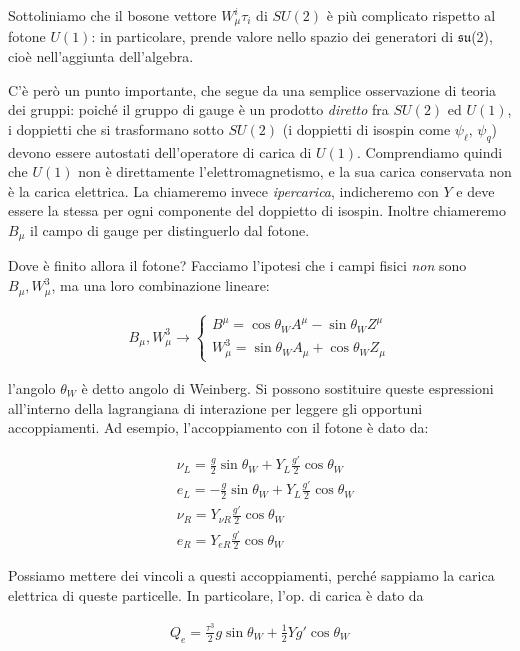 \documentclass[11pt]{report}
\begin{document}
Sottoliniamo che il bosone vettore \(W^i_\mu\tau_i\) di \(SU(2)\) è più complicato rispetto al fotone \(U(1)\): in particolare, prende valore nello spazio dei generatori di \(\mathfrak{su}\)(2), cioè nell'aggiunta dell'algebra. 

C'è però un punto importante, che segue da una semplice osservazione di teoria dei gruppi: poiché il gruppo di gauge è un prodotto \emph{diretto} fra \(SU(2)\) ed \(U(1)\), i doppietti che si trasformano sotto \(SU(2)\) (i doppietti di isospin come \(\psi_\ell, \, \psi_q\)) devono essere autostati dell'operatore di carica di \(U(1)\). Comprendiamo quindi che \(U(1)\) non è direttamente l'elettromagnetismo, e la sua carica conservata non è la carica elettrica. La chiameremo invece \emph{ipercarica}, indicheremo con \(Y\) e deve essere la stessa per ogni componente del doppietto di isospin. Inoltre chiameremo \(B_\mu\) il campo di gauge per distinguerlo dal fotone. 

Dove è finito allora il fotone? Facciamo l'ipotesi che i campi fisici \emph{non} sono \(B_\mu, W_\mu^3\), ma una loro combinazione lineare: 

\begin{align}
    B_\mu, W_\mu^3 \rightarrow \begin{cases}
        B^\mu = \cos\theta_W A^\mu - \sin\theta_W Z^\mu \\
        W^3_\mu = \sin\theta_W A_\mu + \cos\theta_W Z_\mu
    \end{cases}
\end{align}

l'angolo \(\theta_W\) è detto angolo di Weinberg. Si possono sostituire queste espressioni all'interno della lagrangiana di interazione per leggere gli opportuni accoppiamenti. Ad esempio, l'accoppiamento con il fotone è dato da: 

\begin{align}
    &\nu_L = \frac{g}{2}\sin\theta_W + Y_L \frac{g'}{2}\cos\theta_W \\
    &e_L = -\frac{g}{2}\sin\theta_W  + Y_L\frac{g'}{2}\cos\theta_W \\
    &\nu_R = Y_{\nu R}\frac{g'}{2}\cos\theta_W \\
    &e_R = Y_{e R}\frac{g'}{2}\cos\theta_W
\end{align}

Possiamo mettere dei vincoli a questi accoppiamenti, perché sappiamo la carica elettrica di queste particelle. In particolare, l'op. di carica è dato da 

\begin{align}
    Q_e = \frac{\tau^3}{2}g\sin\theta_W + \frac{1}{2}Yg'\cos\theta_W
\end{align}
\end{document}
